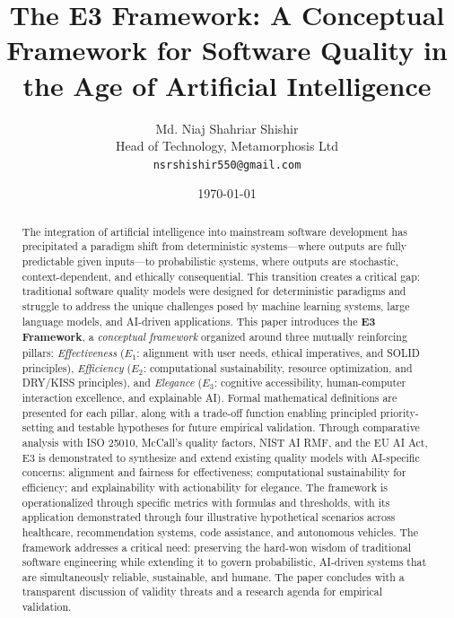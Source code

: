 \documentclass[11pt,a4paper]{article}
\title{\textbf{The E3 Framework: A Conceptual Framework for Software Quality in the Age of Artificial Intelligence}}
\author{%
    Md. Niaj Shahriar Shishir\\Head of Technology, Metamorphosis Ltd\\
    \texttt{nsrshishir550@gmail.com}
}
\date{\today}
\begin{document}
\maketitle

\begin{abstract}
\noindent
The integration of artificial intelligence into mainstream software development has precipitated a paradigm shift from deterministic systems---where outputs are fully predictable given inputs---to probabilistic systems, where outputs are stochastic, context-dependent, and ethically consequential. This transition creates a critical gap: traditional software quality models were designed for deterministic paradigms and struggle to address the unique challenges posed by machine learning systems, large language models, and AI-driven applications. This paper introduces the \textbf{E3 Framework}, a \emph{conceptual framework} organized around three mutually reinforcing pillars: \emph{Effectiveness} ($E_1$: alignment with user needs, ethical imperatives, and SOLID principles), \emph{Efficiency} ($E_2$: computational sustainability, resource optimization, and DRY/KISS principles), and \emph{Elegance} ($E_3$: cognitive accessibility, human-computer interaction excellence, and explainable AI). Formal mathematical definitions are presented for each pillar, along with a trade-off function enabling principled priority-setting and testable hypotheses for future empirical validation. Through comparative analysis with ISO 25010, McCall's quality factors, NIST AI RMF, and the EU AI Act, E3 is demonstrated to synthesize and extend existing quality models with AI-specific concerns: alignment and fairness for effectiveness; computational sustainability for efficiency; and explainability with actionability for elegance. The framework is operationalized through specific metrics with formulas and thresholds, with its application demonstrated through four illustrative hypothetical scenarios across healthcare, recommendation systems, code assistance, and autonomous vehicles. The framework addresses a critical need: preserving the hard-won wisdom of traditional software engineering while extending it to govern probabilistic, AI-driven systems that are simultaneously reliable, sustainable, and humane. The paper concludes with a transparent discussion of validity threats and a research agenda for empirical validation.
\end{abstract}
\end{document}
